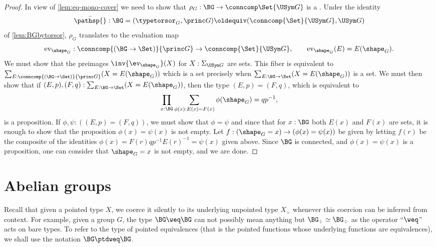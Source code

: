 \begin{proof}
  In view of \cref{lem:eq-mono-cover} we need to show that $\rho_G:\BG\to \conncomp \Set {\USym G}$ is a
  \covering.
  Under the identity
  $$\bar{\pathsp{}}:\BG=(\typetorsor_G,\princ G)\oldequiv (\conncomp{\Set}{\USym G},\USym G)$$ of
  \cref{lem:BGbytorsor}, $\rho_G$ translates to the
  evaluation map
  $$\mathrm{ev}_{\shape_G}:\conncomp{(\BG\to\Set)}{\princ G}\to\conncomp{\Set}{\USym G},\qquad
  \mathrm{ev}_{\shape_G}(E)=E(\shape_G).$$
  We must show that the preimages
  $\inv{\ev_{\shape_G}}(X)$ for $X:\Sigma_{\USym G}$ are sets.  This
  fiber is equivalent to
  $\sum_{E:\conncomp{(\BG\to\Set)}{\princ G}}(X=E(\shape_G))$ which is a
  set precisely when $\sum_{E:\BG\to\Set}(X=E(\shape_G))$ is a set.  We
  must then show that if $(E,p),(F,q):\sum_{E:\BG\to\Set}(X=E(\shape_G))$,
  then the type $(E,p)=(F,q)$, which is equivalent
to
  $$\prod_{x:\BG}\sum_{\phi(x):E(x)=F(x)}\phi(\shape_G)=qp^{-1},$$
  is a proposition.
If $\phi,\psi:((E,p)=(F,q))$, we
  must show that $\phi=\psi$ and since that for $x:\BG$ both $E(x)$ and
  $F(x)$ are sets, it is enough to show that the proposition
  $\phi(x)=\psi(x)$ is not empty.  Let
  $f:(\shape_G=x)\to(\phi(x)=\psi(x))$ be given by letting $f(r)$ be the
  composite of the identities $\phi(x)=F(r)qp^{-1}E(r)^{-1}=\psi(x)$
  given above.  Since $\BG$ is connected, and $\phi(x)=\psi(x)$ is a
  proposition, one can consider that $\shape_G=x$ is not empty, and we
  are done.
\end{proof}


\section{Abelian groups}
\label{sec:abelian-groups}

Recall that given a pointed type $X$, we coerce it silently to its
underlying unpointed type $X_\div$ whenever this coercion can be
inferred from context. For example, given a group $G$, the type
$\BG\weq \BG$ can not possibly mean anything but
$\BG_\div\simeq \BG_\div$ as the operator ``$\weq$'' acts on bare
types. To refer to the type of pointed equivalences (that is the
pointed functions whose underlying functions are equivalences), we
shall use the notation $\BG \ptdweq \BG$.%

